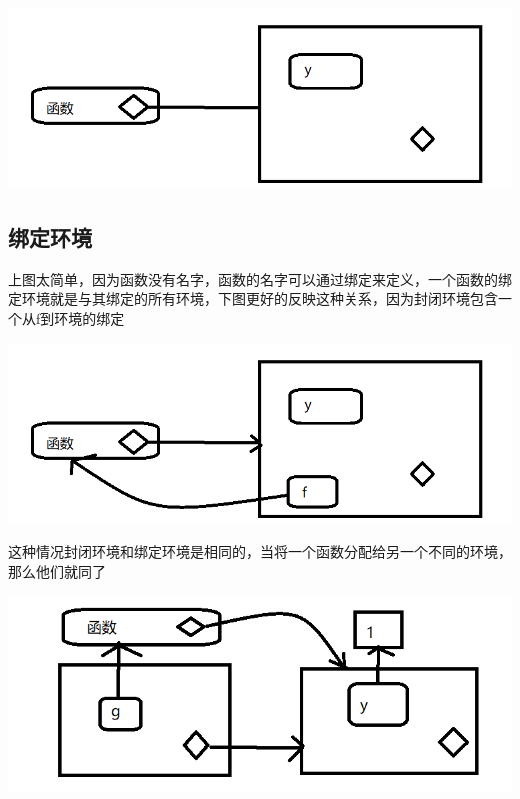 \documentclass[]{book}
\newenvironment{Shaded}{\begin{snugshade}}{\end{snugshade}}
\newcommand{\KeywordTok}[1]{\textcolor[rgb]{0.13,0.29,0.53}{\textbf{#1}}}
\newcommand{\DecValTok}[1]{\textcolor[rgb]{0.00,0.00,0.81}{#1}}
\newcommand{\StringTok}[1]{\textcolor[rgb]{0.31,0.60,0.02}{#1}}
\newcommand{\ControlFlowTok}[1]{\textcolor[rgb]{0.13,0.29,0.53}{\textbf{#1}}}
\newcommand{\OperatorTok}[1]{\textcolor[rgb]{0.81,0.36,0.00}{\textbf{#1}}}
\newcommand{\NormalTok}[1]{#1}
\begin{document}
\begin{center}\includegraphics{img/ch7-6} \end{center}

\subsection{绑定环境}

上图太简单，因为函数没有名字，函数的名字可以通过绑定来定义，一个函数的绑定环境就是与其绑定的所有环境，下图更好的反映这种关系，因为封闭环境包含一个从f到环境的绑定

\begin{center}\includegraphics{img/ch7-7} \end{center}

这种情况封闭环境和绑定环境是相同的，当将一个函数分配给另一个不同的环境，那么他们就同了

\begin{Shaded}
\end{Shaded}

\begin{center}\includegraphics{img/ch7-8} \end{center}
\end{document}
